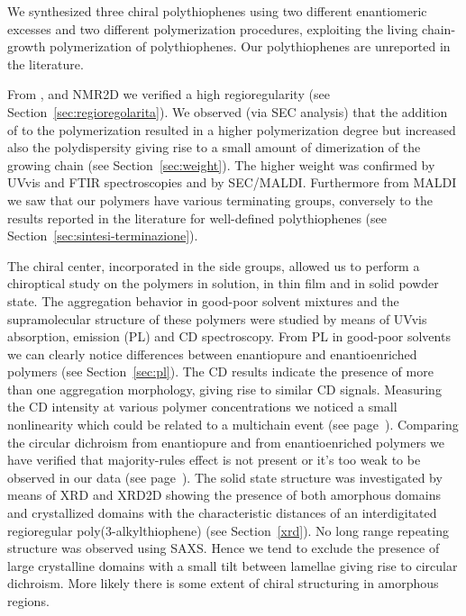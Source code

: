 We synthesized three chiral polythiophenes using two different enantiomeric excesses and two different polymerization procedures, exploiting the living chain-growth polymerization of polythiophenes. 
Our polythiophenes are unreported in the literature.

From {\HNMR}, {\CNMR} and \gls{NMR2D} we verified a high regioregularity (see Section~\ref{sec:regioregolarita}). We observed (via \gls{SEC} analysis) that the addition of  to the polymerization resulted in a higher polymerization degree but increased also the polydispersity giving rise to a small amount of dimerization of the growing chain (see Section~\ref{sec:weight}). The higher weight was confirmed by \gls{UVvis} and \gls{FTIR} spectroscopies and by \gls{SEC}\-/\gls{MALDI}. Furthermore from \gls{MALDI} we saw that our polymers have various terminating groups, conversely to the results reported in the literature for well-defined polythiophenes (see Section~\ref{sec:sintesi-terminazione}). 

The chiral center, incorporated in the side groups, allowed us to perform a chiroptical study on the polymers in solution, in thin film and in solid powder state. The aggregation behavior in good-poor solvent mixtures and the supramolecular structure of these polymers were studied by means of \gls{UVvis} absorption, emission (\gls{PL}) and \acrfull{CD} spectroscopy. From \gls{PL} in good-poor solvents we can clearly notice differences between enantiopure and enantioenriched polymers (see Section~\ref{sec:pl}). 
The \gls{CD} results indicate the presence of more than one aggregation morphology, giving rise to similar \gls{CD} signals. 
Measuring the \gls{CD} intensity at various polymer concentrations we noticed a small nonlinearity which could be related to a multi\-chain event (see page~\pageref{nonlinearita}). 
Comparing the circular dichroism from enantiopure and from enantioenriched polymers we have verified that majority-rules effect is not present or it's too weak to be observed in our data (see page~\pageref{majority}). The solid state structure was investigated by means of \gls{XRD} and \acrshort{XRD2D} showing the presence of both amorphous domains and crystallized domains with the characteristic distances of an interdigitated regioregular poly\-(3-alkyl\-thio\-phene) (see Section~\ref{xrd}). No long range repeating structure was observed using \acrshort{SAXS}. Hence we tend to exclude the presence of large crystalline domains with a small tilt between lamellae giving rise to circular dichroism. More likely there is some extent of chiral structuring in amorphous regions. 

